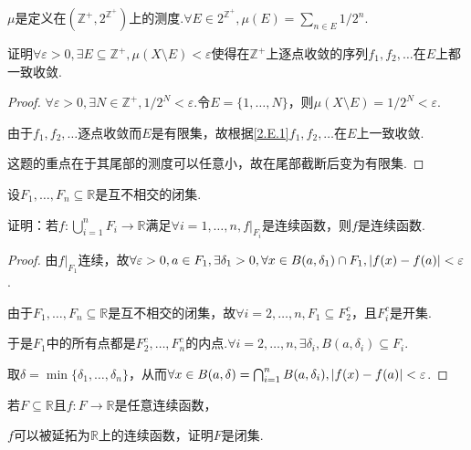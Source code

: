 \begin{problem}[8]\label{2.E.8}
    \(\mu\)是定义在\((\mathbb{Z}^+, 2^{\mathbb{Z}^+})\)上的测度.\(\forall E \in 2^{\mathbb{Z}^+}, \mu(E)=\sum_{n \in E}1/2^n\).

    证明\(\forall \varepsilon>0, \exists E \subseteq \mathbb{Z}^+, \mu(X \setminus E)<\varepsilon\)使得在\(\mathbb{Z}^+\)上逐点收敛的序列\(f_1, f_2, \dots\)在\(E\)上都一致收敛.
\end{problem}

\begin{proof}
    \(\forall \varepsilon>0, \exists N \in \mathbb{Z}^+, 1/2^N<\varepsilon\).令\(E=\{1, \dots, N\}\)，则\(\mu(X \setminus E)=1/2^N<\varepsilon\).

    由于\(f_1, f_2, \dots\)逐点收敛而\(E\)是有限集，故根据\cref{2.E.1}\(f_1, f_2, \dots\)在\(E\)上一致收敛.

    {\kaishu 这题的重点在于其尾部的测度可以任意小，故在尾部截断后变为有限集.}
\end{proof}

\begin{problem}[9]\label{2.E.9}
    设\(F_1, \dots, F_n \subseteq \mathbb{R}\)是互不相交的闭集.

    证明：若\(f: \bigcup_{i=1}^n F_i \to \mathbb{R}\)满足\(\forall i=1, \dots, n, \left.f\right|_{F_i}\)是连续函数，则\(f\)是连续函数.
\end{problem}

\begin{proof}
    由\(\left.f\right|_{F_1}\)连续，故\(\forall \varepsilon>0, a \in F_1, \exists \delta_1>0, \forall x \in B(a,\delta_1) \cap F_1, \abs*{f(x)-f(a)}<\varepsilon\).

    由于\(F_1, \dots, F_n \subseteq \mathbb{R}\)是互不相交的闭集，故\(\forall i=2, \dots, n, F_1 \subseteq F_2^c\)，且\(F_i^c\)是开集.

    于是\(F_1\)中的所有点都是\(F_2^c, \dots, F_n^c\)的内点.\(\forall i=2, \dots, n, \exists \delta_i, B(a,\delta_i) \subseteq F_i\).

    取\(\delta=\min\{\delta_1, \dots, \delta_n\}\)，从而\(\forall x \in B(a,\delta)=\bigcap_{i=1}^n B(a,\delta_i), \abs*{f(x)-f(a)}<\varepsilon\).
\end{proof}

\newpage

\begin{problem}[10]\label{2.E.10}
    若\(F \subseteq \mathbb{R}\)且\(f: F \to \mathbb{R}\)是任意连续函数，
    
    \(f\)可以被延拓为\(\mathbb{R}\)上的连续函数，证明\(F\)是闭集.
\end{problem}

